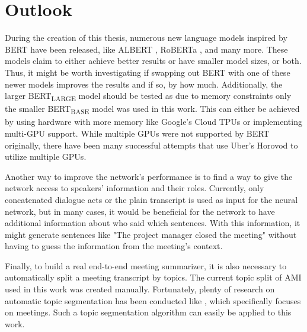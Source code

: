 \chapter{Outlook}\label{ch:outlook}

During the creation of this thesis, numerous new language models inspired by BERT have been released, like ALBERT \cite{1909.11942}, RoBERTa \cite{1907.11692}, and many more.
These models claim to either achieve better results or have smaller model sizes, or both.
Thus, it might be worth investigating if swapping out BERT with one of these newer models improves the results and if so, by how much.
Additionally, the larger BERT\textsubscript{LARGE} model should be tested as due to memory constraints only the smaller BERT\textsubscript{BASE} model was used in this work.
This can either be achieved by using hardware with more memory like Google's Cloud TPUs or implementing multi-GPU support.
While multiple GPUs were not supported by BERT originally, there have been many successful attempts that use Uber's Horovod \cite{sergeev2018horovod} to utilize multiple GPUs.

Another way to improve the network's performance is to find a way to give the network access to speakers' information and their roles.
Currently, only concatenated dialogue acts or the plain transcript is used as input for the neural network, but in many cases, it would be beneficial for the network to have additional information about who said which sentences.
With this information, it might generate sentences like "The project manager closed the meeting" without having to guess the information from the meeting's context.

Finally, to build a real end-to-end meeting summarizer, it is also necessary to automatically split a meeting transcript by topics.
The current topic split of AMI used in this work was created manually.
Fortunately, plenty of research on automatic topic segmentation has been conducted like \cite{10.3115/1075096.1075167}, which specifically focuses on meetings.
Such a topic segmentation algorithm can easily be applied to this work.